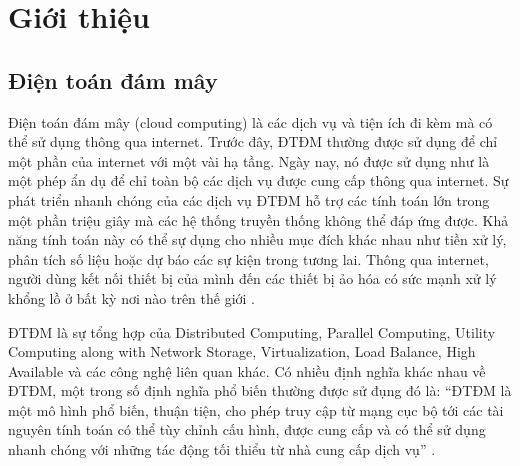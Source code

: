 \section{Giới thiệu}
\label{introduction}

\subsection{Điện toán đám mây}
Điện toán đám mây (cloud computing) là các dịch vụ và tiện ích đi kèm mà có thể sử dụng thông qua internet. Trước đây, ĐTĐM thường được sử dụng để chỉ một phần của internet với một vài hạ tầng. Ngày nay, nó được sử dụng như là một phép ẩn dụ để chỉ toàn bộ các dịch vụ được cung cấp thông qua internet. Sự phát triển nhanh chóng của các dịch vụ ĐTĐM hỗ trợ các tính toán lớn trong một phần triệu giây mà các hệ thống truyền thống không thể đáp ứng được. Khả năng tính toán này có thể sự dụng cho nhiều mục đích khác nhau như tiền xử lý, phân tích số liệu hoặc dự báo các sự kiện trong tương lai. Thông qua internet, người dùng kết nối thiết bị của mình đến các thiết bị ảo hóa có sức mạnh xử lý khổng lồ ở bất kỳ nơi nào trên thế giới \cite{furht2010handbook}.

ĐTĐM là sự tổng hợp của Distributed Computing, Parallel Computing, Utility Computing along with Network Storage, Virtualization, Load Balance, High Available và các công nghệ liên quan khác. Có nhiều định nghĩa khác nhau về ĐTĐM, một trong số định nghĩa phổ biến thường được sử đụng đó là: “ĐTĐM là một mô hình phổ biến, thuận tiện, cho phép truy cập từ mạng cục bộ tới các tài nguyên tính toán có thể tùy chỉnh cấu hình, được cung cấp và có thể sử dụng nhanh chóng với những tác động tối thiểu từ nhà cung cấp dịch vụ” \cite{mell2011nist}.
